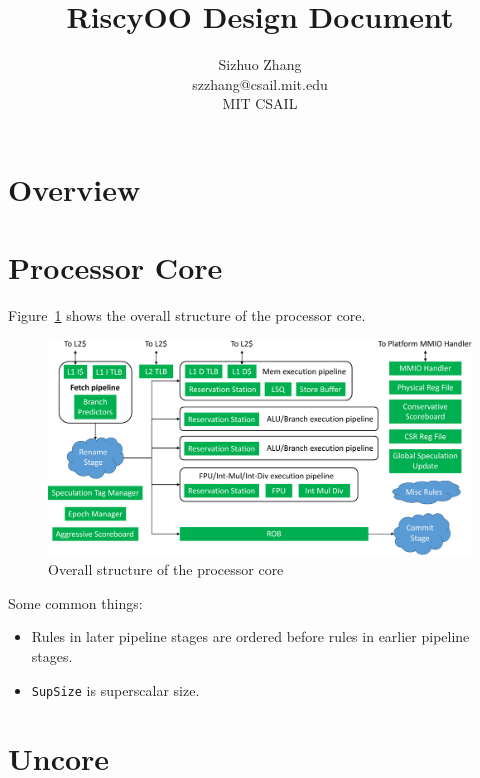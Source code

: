 \documentclass[12pt]{article}
\newcommand{\code}[1]{\texttt{#1}}
\begin{document}
\title{RiscyOO Design Document}
\author{Sizhuo Zhang \\ szzhang@csail.mit.edu \\ MIT CSAIL}
\date{}
\maketitle

\section{Overview}


\section{Processor Core}

Figure~\ref{fig:core} shows the overall structure of the processor core.
\begin{figure}[!htb]
    \centering
    \includegraphics[width=\columnwidth]{fig/core_crop.pdf}
    \caption{Overall structure of the processor core}\label{fig:core}
\end{figure}

Some common things:
\begin{itemize}
    \item Rules in later pipeline stages are ordered before rules in earlier pipeline stages.
    \item \code{SupSize} is superscalar size.
\end{itemize}









\section{Uncore}
\end{document}
